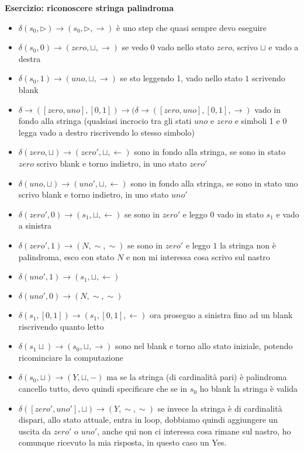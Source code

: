 \textbf{\Large Esercizio: riconoscere stringa palindroma}\\
\begin{itemize}
    \item $\delta(s_0,\triangleright)\to (s_0,\triangleright, \rightarrow)$ è uno step che quasi sempre devo eseguire
    \item $\delta(s_0,0)\to (zero,\sqcup, \rightarrow)$ se vedo 0 vado nello stato $zero$, scrivo $\sqcup$ e vado a destra
    \item $\delta(s_0,1)\to (uno,\sqcup, \rightarrow)$ se sto leggendo 1, vado nello stato $1$ scrivendo blank
    \item $\delta\to([zero, uno],[0,1])\to(\delta\to([zero, uno],[0,1],\rightarrow)$ vado in fondo alla stringa (qualsiasi incrocio tra gli stati $uno$ e $zero $ e simboli 1 e 0 legga vado a destro riscrivendo lo stesso simbolo)
    \item $\delta(zero, \sqcup)\to(zero', \sqcup, \leftarrow)$ sono in fondo alla stringa, se sono in stato $zero$ scrivo blank e torno indietro, in uno stato $zero'$
    \item $\delta(uno, \sqcup)\to(uno', \sqcup, \leftarrow)$ sono in fondo alla stringa, se sono in stato uno scrivo blank e torno indietro, in uno stato $uno'$ 
    \item $\delta(zero', 0)\to(s_1,\sqcup, \leftarrow)$ se sono in $zero'$ e leggo $0$ vado in stato $s_1$ e vado a sinistra 
    \item $\delta(zero', 1)\to(N,\sim, \sim)$ se sono in $zero'$ e leggo $1$ la stringa non è palindroma, esco con stato $N$ e non mi interessa cosa scrivo sul nastro
    \item $\delta(uno', 1)\to(s_1,\sqcup, \leftarrow)$ 
    \item $\delta(uno', 0)\to(N,\sim, \sim)$
    \item $\delta(s_1,[0,1])\to(s_1,[0,1], \leftarrow)$ ora proseguo a sinistra fino ad un blank riscrivendo quanto letto
    \item $\delta(s_1\sqcup)\to(s_0,\sqcup, \rightarrow)$ sono nel blank e torno allo stato iniziale, potendo ricominciare la computazione
    \item $\delta(s_0,\sqcup)\to(Y, \sqcup,-)$ ma se la stringa (di cardinalità pari) è palindroma cancello tutto, devo      quindi specificare che se in $s_0$ ho blank la stringa è valida    
    \item $\delta([zero',uno'], \sqcup)\to(Y, \sim, \sim)$ se invece la stringa è di cardinalità dispari, allo stato attuale, entra in loop, dobbiamo quindi aggiungere un uscita da $zero'$ o $uno'$, anche qui non ci interessa cosa rimane sul nastro, ho comunque ricevuto la mia risposta, in questo caso un Yes.
\end{itemize}

